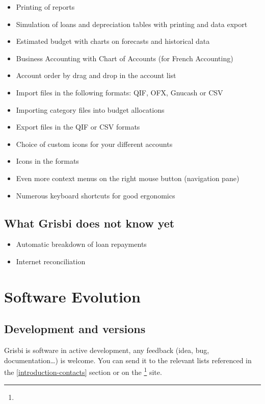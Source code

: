 \begin{itemize}
	\item Printing of reports
	\item Simulation of loans and depreciation tables with printing and data export
	\item Estimated budget with charts on forecasts and historical data
	\item Business Accounting with Chart of Accounts (for French Accounting)
	\item Account order by drag and drop in the account list
	\item Import files in the following formats: \gls{QIF}, \gls{OFX}, \gls{Gnucash} or \gls{CSV}
	\item Importing category files into budget allocations
	\item Export files in the \gls{QIF} or \gls{CSV} formats
	\item Choice of custom icons for your different accounts
	\item Icons in the  formats
	\item Even more context menus on the right mouse button (navigation pane)
	\item Numerous keyboard shortcuts for good ergonomics
\end{itemize}

\subsection{What Grisbi does not know yet}

\begin{itemize}
	\item Automatic breakdown of loan repayments
	\item Internet reconciliation
\end{itemize}

\section{Software Evolution}

\subsection{Development and versions\label{introduction-versions}}

Grisbi is software in active development, any feedback (idea, bug, documentation\dots{}) is welcome. You can send it to the relevant lists referenced in the  \vref{introduction-contacts}  section or on the  \footnote{\urlGrisbi{}} site.


